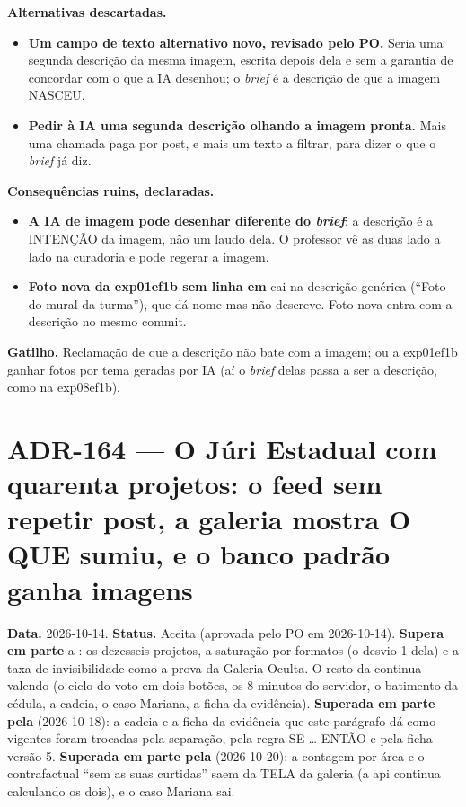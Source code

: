 \textbf{Alternativas descartadas.}

\begin{itemize}
  \item \textbf{Um campo de texto alternativo novo, revisado pelo PO.} Seria uma
    segunda descrição da mesma imagem, escrita depois dela e sem a garantia de
    concordar com o que a IA desenhou; o \emph{brief} é a descrição de que a
    imagem NASCEU.
  \item \textbf{Pedir à IA uma segunda descrição olhando a imagem pronta.} Mais
    uma chamada paga por post, e mais um texto a filtrar, para dizer o que o
    \emph{brief} já diz.
\end{itemize}

\textbf{Consequências ruins, declaradas.}

\begin{itemize}
  \item \textbf{A IA de imagem pode desenhar diferente do \emph{brief}}: a
    descrição é a INTENÇÃO da imagem, não um laudo dela. O professor vê as duas
    lado a lado na curadoria e pode regerar a imagem.
  \item \textbf{Foto nova da exp01ef1b sem linha em }
    cai na descrição genérica (\enquote{Foto do mural da turma}), que dá nome
    mas não descreve. Foto nova entra com a descrição no mesmo commit.
\end{itemize}

\textbf{Gatilho.} Reclamação de que a descrição não bate com a imagem; ou a
exp01ef1b ganhar fotos por tema geradas por IA (aí o \emph{brief} delas passa
a ser a descrição, como na exp08ef1b).


\section{ADR-164 --- O Júri Estadual com quarenta projetos: o feed sem repetir post, a galeria mostra O QUE sumiu, e o banco padrão ganha imagens}
\label{adr:exp06ef1b-quarenta-projetos}

\textbf{Data.} 2026-10-14. \textbf{Status.} Aceita (aprovada pelo PO em
2026-10-14). \textbf{Supera em parte} a : os dezesseis projetos, a
saturação por formatos (o desvio 1 dela) e a taxa de invisibilidade como a prova
da Galeria Oculta. O resto da  continua valendo (o ciclo do voto
em dois botões, os 8 minutos do servidor, o batimento da cédula, a cadeia, o caso
Mariana, a ficha da evidência). \textbf{Superada em parte pela }
(2026-10-18): a cadeia e a ficha da evidência que este parágrafo dá como
vigentes foram trocadas pela separação, pela regra SE \ldots{} ENTÃO e pela
ficha versão 5. \textbf{Superada em parte pela } (2026-10-20): a
contagem por área e o contrafactual \enquote{sem as suas curtidas} saem da TELA
da galeria (a api continua calculando os dois), e o caso Mariana sai.

